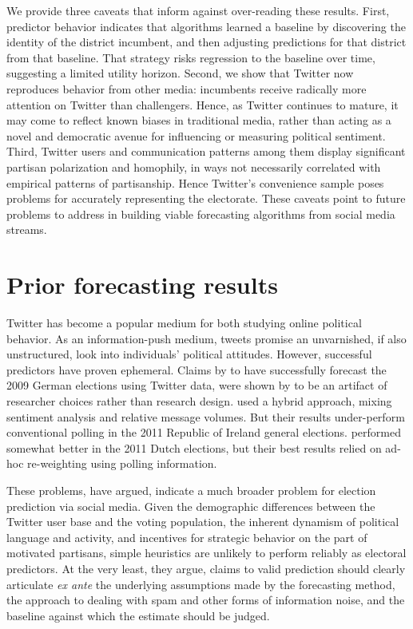 \documentclass{acm_proc_article-sp}
\begin{document}
We provide three caveats that inform against over-reading these
results. First, predictor behavior indicates that algorithms learned a
baseline by discovering the identity of the district incumbent, and
then adjusting predictions for that district from that baseline. That
strategy risks regression to the baseline over time, suggesting a
limited utility horizon. Second, we show that Twitter now reproduces
behavior from other media: incumbents receive radically more attention
on Twitter than challengers. Hence, as Twitter continues to mature, it
may come to reflect known biases in traditional media, rather than
acting as a novel and democratic avenue for influencing or measuring
political sentiment. Third, Twitter users and communication patterns
among them display significant partisan polarization and homophily, in
ways not necessarily correlated with empirical patterns of
partisanship. Hence Twitter's convenience sample poses problems for
accurately representing the electorate. These caveats point to future
problems to address in building viable forecasting algorithms from
social media streams.


\section{Prior forecasting results}
\label{sec:prior-forec-results}

Twitter has become a popular medium for both studying online political
behavior. As an information-push medium,
tweets promise an unvarnished, if also unstructured, look into
individuals' political attitudes. However, successful predictors have
proven ephemeral. Claims by \cite{tumasjan2010election} to have
successfully forecast the 2009 German elections using Twitter
data, were shown by \cite{jungherr2012pirate} to be an artifact of
researcher choices rather than research
design. \cite{bermingham2011using} used a hybrid approach, mixing
sentiment analysis and relative message volumes. But their results
under-perform conventional polling in the 2011 Republic of Ireland
general elections. \cite{sang2012predicting} performed somewhat better
in the 2011 Dutch elections, but their best results relied on ad-hoc
re-weighting using polling information. 

These problems, \cite{metaxas2011not} have argued, indicate a much
broader problem for election prediction via social media. Given the
demographic differences between the Twitter user base and the voting
population, the inherent dynamism of political language and activity,
and incentives for strategic behavior on the part of motivated
partisans, simple heuristics are unlikely to perform reliably as
electoral predictors. At the very least, they argue, claims to valid
prediction should clearly articulate \textit{ex ante} the underlying
assumptions made by the forecasting method, the approach to dealing
with spam and other forms of information noise, and the baseline
against which the estimate should be judged. 
\end{document}
